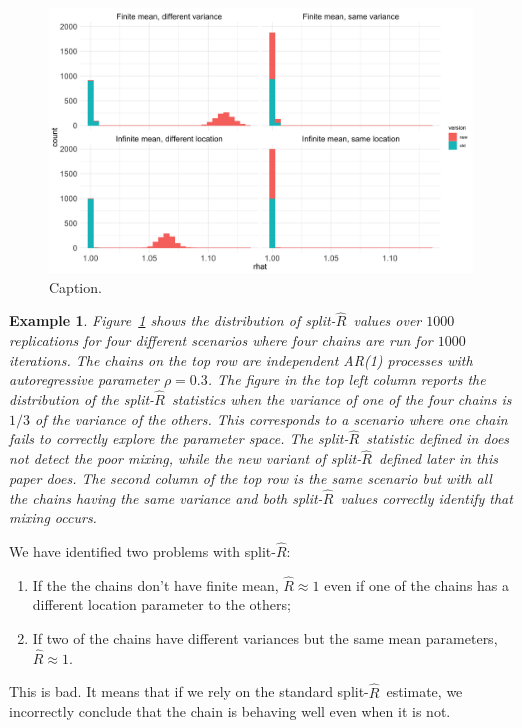\documentclass[american,]{article}
\newcommand{\sRhat}{split-$\widehat{R}$}
\newtheorem{example}{Example}
\begin{document}
\begin{figure}
\centering
\includegraphics[width=\textwidth]{graphics/simple_rhat_compare.png}
\caption{ Caption. \label{fig:simple_example}}
\end{figure}
\begin{example}
Figure~\ref{fig:simple_example} shows the distribution of \sRhat\  values over $1000$ replications for four different scenarios where four chains are run for $1000$ iterations. The chains on the top row are independent AR(1) processes with autoregressive parameter $\rho=0.3$. The figure in the top left column reports the distribution of the \sRhat\ statistics  when the variance of one of the four chains is $1/3$ of the variance of the others. This corresponds to a scenario where one chain fails to correctly explore the parameter space. The \sRhat\ statistic defined in \citet{BDA3}  does not detect the poor mixing, while the new variant of \sRhat\ defined later in this paper does. The second column of the top row is the same scenario but with all the chains having the same variance and both \sRhat\ values correctly identify that mixing occurs.


\end{example}

We have identified two problems with \sRhat : 
\begin{enumerate}
\item If the the chains don't have finite mean, $\widehat{R} \approx 1$ even if one of the chains has a different location parameter to the others;
\item If two of the chains have different variances but the same mean parameters, $\widehat{R} \approx 1$.
\end{enumerate}
This is bad. It means that if we rely on the standard \sRhat\ estimate, we incorrectly conclude that the chain is behaving well even when it is not.
\end{document}
